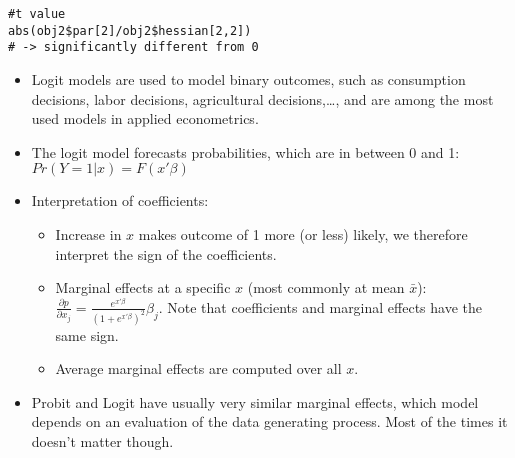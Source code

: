 \begin{Solution}{12.7}
\begin{verbatim}
#t value
abs(obj2$par[2]/obj2$hessian[2,2])
# -> significantly different from 0
\end{verbatim}
\begin{itemize}
  \item Logit models are used to model binary outcomes, such as consumption decisions, labor decisions, agricultural decisions,\dots, and are among the most used models in applied econometrics.
  \item The logit model forecasts probabilities, which are in between 0 and 1: $Pr(Y=1|x)=F(x'\beta)$
  \item Interpretation of coefficients:
  \begin{itemize}
    \item Increase in $x$ makes outcome of 1 more (or less) likely, we therefore interpret the sign of the coefficients.
    \item Marginal effects at a specific $x$ (most commonly at mean $\bar{x}$): $\frac{\partial p}{\partial x_j} = \frac{e^{x'\beta}}{(1+e^{x'\beta})^2}\beta_j$. Note that coefficients and marginal effects have the same sign.
    \item Average marginal effects are computed over all $x$.
  \end{itemize}
  \item Probit and Logit have usually very similar marginal effects, which model depends on an evaluation of the data generating process. Most of the times it doesn't matter though.
\end{itemize}
\end{Solution}
